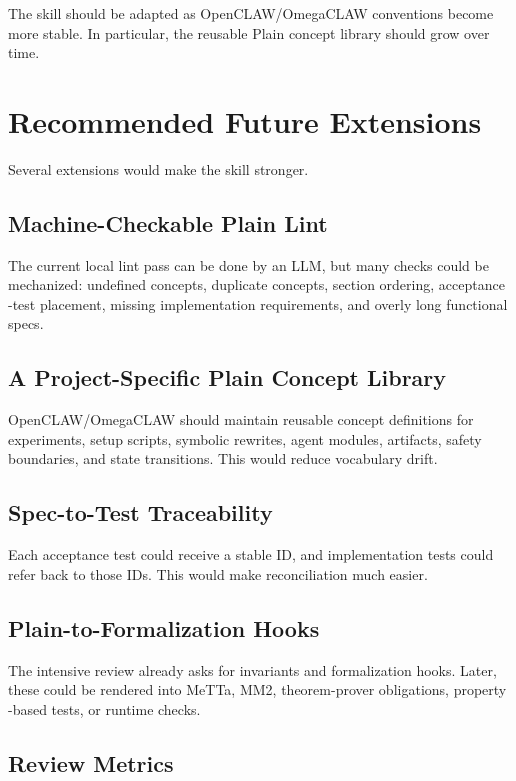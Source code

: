 \documentclass[11pt]{article}
\begin{document}
The skill should be adapted as OpenCLAW/OmegaCLAW conventions become more stable.
In particular, the reusable Plain concept library should grow over time.

\section{Recommended Future Extensions}

Several extensions would make the skill stronger.

\subsection{Machine-Checkable Plain Lint}

The current local lint pass can be done by an LLM, but many checks could be
mechanized: undefined concepts, duplicate concepts, section ordering, acceptance
-test placement, missing implementation requirements, and overly long functional
specs.

\subsection{A Project-Specific Plain Concept Library}

OpenCLAW/OmegaCLAW should maintain reusable concept definitions for experiments,
setup scripts, symbolic rewrites, agent modules, artifacts, safety boundaries,
and state transitions. This would reduce vocabulary drift.

\subsection{Spec-to-Test Traceability}

Each acceptance test could receive a stable ID, and implementation tests could
refer back to those IDs. This would make reconciliation much easier.

\subsection{Plain-to-Formalization Hooks}

The intensive review already asks for invariants and formalization hooks. Later,
these could be rendered into MeTTa, MM2, theorem-prover obligations, property
-based tests, or runtime checks.

\subsection{Review Metrics}
\end{document}
